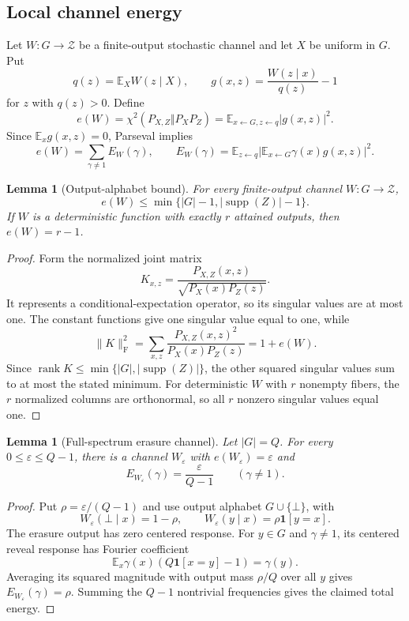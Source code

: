 \documentclass[11pt]{article}
\newtheorem{lemma}[theorem]{Lemma}
\theoremstyle{definition}
\newcommand{\E}{\mathbb{E}}
\newcommand{\chitwo}{\chi^2}
\newcommand{\supp}{\operatorname{supp}}
\begin{document}
\subsection{Local channel energy}

Let $W:G\to\mathcal Z$ be a finite-output stochastic channel and let $X$ be
uniform in $G$.  Put
\[
  q(z)=\E_X W(z\mid X),\qquad
  g(x,z)=\frac{W(z\mid x)}{q(z)}-1
\]
for $z$ with $q(z)>0$.  Define
\begin{equation}\label{eq:energy}
 e(W)=\chitwo(P_{X,Z}\Vert P_XP_Z)
     =\E_{x\leftarrow G,z\leftarrow q}|g(x,z)|^2.
\end{equation}
Since $\E_xg(x,z)=0$, Parseval implies
\begin{equation}\label{eq:spectral-energy}
 e(W)=\sum_{\gamma\neq 1}E_W(\gamma),\qquad
 E_W(\gamma)=\E_{z\leftarrow q}
     \left|\E_{x\leftarrow G}\gamma(x)g(x,z)\right|^2.
\end{equation}

\begin{lemma}[Output-alphabet bound]\label{lem:alphabet}
For every finite-output channel $W:G\to\mathcal Z$,
\[
 e(W)\leq \min\{|G|-1,|\supp(Z)|-1\}.
\]
If $W$ is a deterministic function with exactly $r$ attained outputs, then
$e(W)=r-1$.
\end{lemma}

\begin{proof}
Form the normalized joint matrix
\[
 K_{x,z}=\frac{P_{X,Z}(x,z)}{\sqrt{P_X(x)P_Z(z)}}.
\]
It represents a conditional-expectation operator, so its singular values are at
most one.  The constant functions give one singular value equal to one, while
\[
 \|K\|_{\mathrm F}^2
   =\sum_{x,z}\frac{P_{X,Z}(x,z)^2}{P_X(x)P_Z(z)}
   =1+e(W).
\]
Since $\operatorname{rank}K\leq\min\{|G|,|\supp(Z)|\}$, the other squared
singular values sum to at most the stated minimum.  For deterministic $W$ with $r$ nonempty
fibers, the $r$ normalized columns are orthonormal, so all $r$ nonzero singular
values equal one.
\end{proof}

\begin{lemma}[Full-spectrum erasure channel]\label{lem:erasure}
Let $|G|=Q$.  For every $0\leq\varepsilon\leq Q-1$, there is a channel
$W_\varepsilon$ with $e(W_\varepsilon)=\varepsilon$ and
\[
 E_{W_\varepsilon}(\gamma)=\frac{\varepsilon}{Q-1}
 \qquad(\gamma\neq1).
\]
\end{lemma}

\begin{proof}
Put $\rho=\varepsilon/(Q-1)$ and use output alphabet $G\cup\{\bot\}$, with
\[
 W_\varepsilon(\bot\mid x)=1-\rho,\qquad
 W_\varepsilon(y\mid x)=\rho\mathbf1[y=x].
\]
The erasure output has zero centered response.  For $y\in G$ and
$\gamma\neq1$, its centered reveal response has Fourier coefficient
\[
 \E_x\gamma(x)(Q\mathbf1[x=y]-1)=\gamma(y).
\]
Averaging its squared magnitude with output mass $\rho/Q$ over all $y$ gives
$E_{W_\varepsilon}(\gamma)=\rho$.  Summing the $Q-1$ nontrivial frequencies
gives the claimed total energy.
\end{proof}
\end{document}
